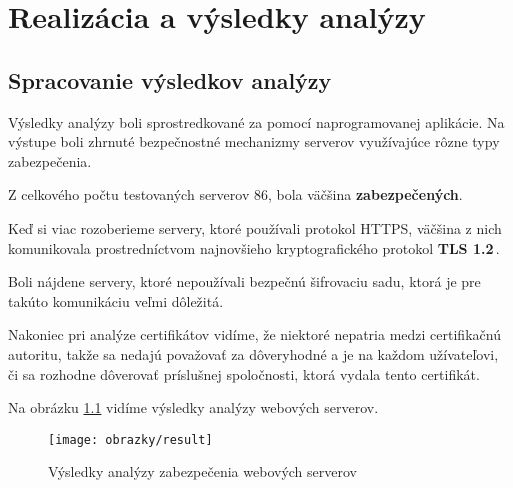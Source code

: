 \chapter[Realizácia a výsledky analýzy]{Realizácia a výsledky analýzy}
\section{Spracovanie výsledkov analýzy}
Výsledky analýzy boli sprostredkované za pomocí naprogramovanej aplikácie. Na výstupe boli zhrnuté bezpečnostné mechanizmy serverov využívajúce rôzne typy zabezpečenia. 

Z celkového počtu testovaných serverov 86, bola väčšina \textbf{zabezpečených}.

Keď si viac rozoberieme servery, ktoré používali protokol HTTPS, väčšina z nich komunikovala prostredníctvom najnovšieho kryptografického protokol \textbf{TLS 1.2}\,.

Boli nájdene servery, ktoré nepoužívali bezpečnú šifrovaciu sadu, ktorá je pre takúto komunikáciu veľmi dôležitá.

Nakoniec pri analýze certifikátov vidíme, že niektoré nepatria medzi certifikačnú autoritu, takže sa nedajú považovať za dôveryhodné a je na každom užívateľovi, či sa rozhodne dôverovať príslušnej spoločnosti, ktorá vydala tento certifikát.

Na obrázku \ref{result} vidíme výsledky analýzy webových serverov.

\begin{figure}[!h]
    \centering
    \vspace{0.3cm}
    \texttt{[image: obrazky/result]}
    \caption{Výsledky analýzy zabezpečenia webových serverov}
    \label{result}
\end{figure}
